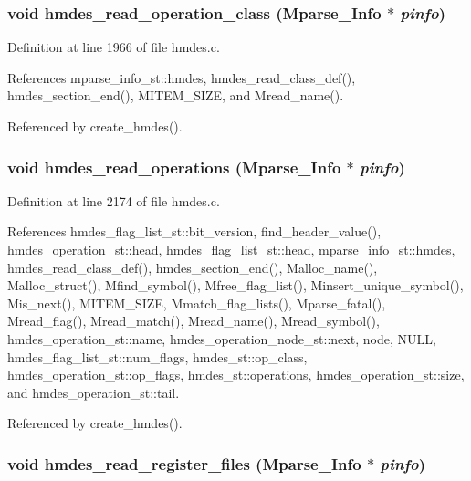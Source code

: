 \subsubsection{\setlength{\rightskip}{0pt plus 5cm}void hmdes\_\-read\_\-operation\_\-class (\bf{Mparse\_\-Info} $\ast$ {\em pinfo})}\label{hmdes_8h_db94157699c98fc24e869b0a9bf62d27}




Definition at line 1966 of file hmdes.c.

References mparse\_\-info\_\-st::hmdes, hmdes\_\-read\_\-class\_\-def(), hmdes\_\-section\_\-end(), MITEM\_\-SIZE, and Mread\_\-name().

Referenced by create\_\-hmdes().
\subsubsection{\setlength{\rightskip}{0pt plus 5cm}void hmdes\_\-read\_\-operations (\bf{Mparse\_\-Info} $\ast$ {\em pinfo})}\label{hmdes_8h_59ea256e06da9fa9c177ec00dd71a4da}




Definition at line 2174 of file hmdes.c.

References hmdes\_\-flag\_\-list\_\-st::bit\_\-version, find\_\-header\_\-value(), hmdes\_\-operation\_\-st::head, hmdes\_\-flag\_\-list\_\-st::head, mparse\_\-info\_\-st::hmdes, hmdes\_\-read\_\-class\_\-def(), hmdes\_\-section\_\-end(), Malloc\_\-name(), Malloc\_\-struct(), Mfind\_\-symbol(), Mfree\_\-flag\_\-list(), Minsert\_\-unique\_\-symbol(), Mis\_\-next(), MITEM\_\-SIZE, Mmatch\_\-flag\_\-lists(), Mparse\_\-fatal(), Mread\_\-flag(), Mread\_\-match(), Mread\_\-name(), Mread\_\-symbol(), hmdes\_\-operation\_\-st::name, hmdes\_\-operation\_\-node\_\-st::next, node, NULL, hmdes\_\-flag\_\-list\_\-st::num\_\-flags, hmdes\_\-st::op\_\-class, hmdes\_\-operation\_\-st::op\_\-flags, hmdes\_\-st::operations, hmdes\_\-operation\_\-st::size, and hmdes\_\-operation\_\-st::tail.

Referenced by create\_\-hmdes().
\subsubsection{\setlength{\rightskip}{0pt plus 5cm}void hmdes\_\-read\_\-register\_\-files (\bf{Mparse\_\-Info} $\ast$ {\em pinfo})}\label{hmdes_8h_6151685cbaff3a77aa055033dfc491da}




